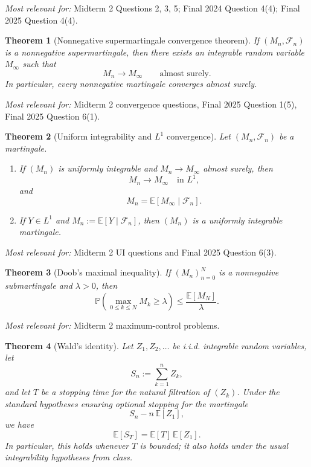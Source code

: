 \documentclass[11pt]{article}
\newtheorem{theorem}{Theorem}[section]
\theoremstyle{definition}
\begin{document}
\emph{Most relevant for:} Midterm 2 Questions 2, 3, 5; Final 2024 Question 4(4); Final 2025 Question 4(4).

\begin{theorem}[Nonnegative supermartingale convergence theorem]
If $(M_n,\mathcal F_n)$ is a nonnegative supermartingale, then there exists an integrable random variable $M_\infty$ such that
\[
M_n \to M_\infty
\qquad \text{almost surely.}
\]
In particular, every nonnegative martingale converges almost surely.
\end{theorem}

\emph{Most relevant for:} Midterm 2 convergence questions, Final 2025 Question 1(5), Final 2025 Question 6(1).

\begin{theorem}[Uniform integrability and $L^1$ convergence]
Let $(M_n,\mathcal F_n)$ be a martingale.
\begin{enumerate}[label=(\roman*)]
    \item If $(M_n)$ is uniformly integrable and $M_n\to M_\infty$ almost surely, then
    \[
    M_n \to M_\infty \quad \text{in } L^1,
    \]
    and
    \[
    M_n = \mathbb E[M_\infty\mid \mathcal F_n].
    \]
    \item If $Y\in L^1$ and $M_n:=\mathbb E[Y\mid \mathcal F_n]$, then $(M_n)$ is a uniformly integrable martingale.
\end{enumerate}
\end{theorem}

\emph{Most relevant for:} Midterm 2 UI questions and Final 2025 Question 6(3).

\begin{theorem}[Doob's maximal inequality]
If $(M_n)_{n=0}^N$ is a nonnegative submartingale and $\lambda>0$, then
\[
\mathbb P\!\left(\max_{0\le k\le N} M_k \ge \lambda\right)
\le
\frac{\mathbb E[M_N]}{\lambda}.
\]
\end{theorem}

\emph{Most relevant for:} Midterm 2 maximum-control problems.

\begin{theorem}[Wald's identity]
Let $Z_1,Z_2,\dots$ be i.i.d. integrable random variables, let
\[
S_n:=\sum_{k=1}^n Z_k,
\]
and let $T$ be a stopping time for the natural filtration of $(Z_k)$.
Under the standard hypotheses ensuring optional stopping for the martingale
\[
S_n - n\,\mathbb E[Z_1],
\]
we have
\[
\mathbb E[S_T] = \mathbb E[T]\,\mathbb E[Z_1].
\]
In particular, this holds whenever $T$ is bounded; it also holds under the usual integrability hypotheses from class.
\end{theorem}
\end{document}
